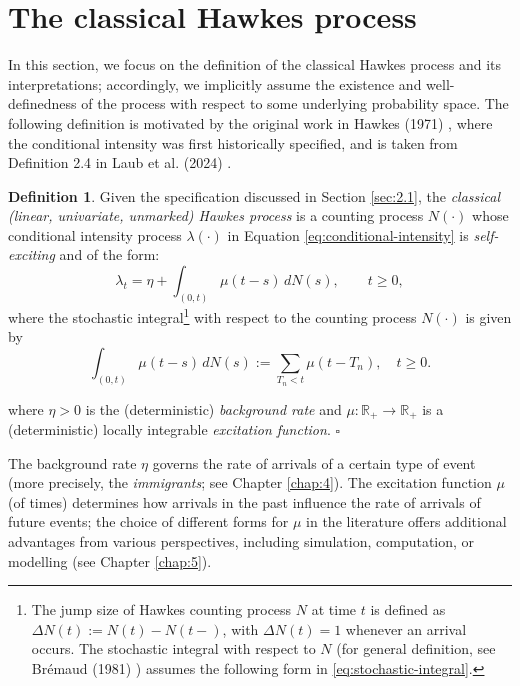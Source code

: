 \documentclass[12pt,a4paper]{report}
\theoremstyle{plain}
\theoremstyle{definition}
\newtheorem{definition}{Definition}[section]
\theoremstyle{remark}
\newcommand{\R}{\mathbb{R}}
\newcommand{\1}{\mathbf{1}}
\begin{document}
\section{The classical Hawkes process}\label{sec:2.2}
In this section, we focus on the definition of the classical Hawkes process and its interpretations; accordingly, we implicitly assume the existence and well-definedness of the process with respect to some underlying probability space. The following definition is motivated by the original work in Hawkes (1971) \cite{Haw71}, where the conditional intensity was first historically specified, and is taken from Definition 2.4 in Laub et al. (2024) \cite{LLPT24}.
\begin{definition}\label{def:2.2.1}
Given the specification discussed in Section \ref{sec:2.1}, the \emph{classical (linear, univariate, unmarked) Hawkes process} is a counting process $N(\cdot)$ whose conditional intensity process $\lambda(\cdot)$ in Equation \eqref{eq:conditional-intensity} is \emph{self-exciting} and of the form:
\begin{equation}\label{eq:hawkes-intensity}
\lambda_t = \eta + \int_{(0,t)} \mu(t-s) \, dN(s), \qquad t \ge 0,
\end{equation}
where the stochastic integral\footnote{The jump size of Hawkes counting process $N$ at time $t$ is defined as $\Delta N(t) := N(t) - N(t-)$, with $\Delta N(t) = 1$ whenever an arrival occurs. The stochastic integral with respect to $N$ (for general definition, see Br\'emaud (1981) \cite{Bre81}) assumes the following form in \eqref{eq:stochastic-integral}.} with respect to the counting process $N(\cdot)$ is given by
\begin{equation}\label{eq:stochastic-integral}
\int_{(0,t)} \mu(t-s) \, dN(s) := \sum_{T_n < t} \mu(t - T_n), \quad t \ge 0.
\end{equation}

where $\eta>0$ is the (deterministic) \emph{background rate} and $\mu:\R_+\to\R_+$ is a (deterministic) locally integrable \emph{excitation function}.
\hfill $\square$
\end{definition}
\noindent
The background rate $\eta$ governs the rate of arrivals of a certain type of event (more precisely, the \emph{immigrants}; see Chapter \ref{chap:4}). The excitation function $\mu$ (of times) determines how arrivals in the past influence the rate of arrivals of future events; the choice of different forms for $\mu$ in the literature offers additional advantages from various perspectives, including simulation, computation, or modelling (see Chapter \ref{chap:5}).
\end{document}
